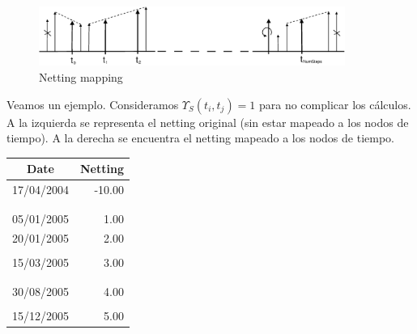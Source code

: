 \begin{figure}[!hb]
\begin{center}
\includegraphics[width=10cm,angle=0]{./images/nettingmapping.eps}
\caption{Netting mapping}
\label{timetranches}
\end{center}
\end{figure}

Veamos un ejemplo. Consideramos $\Upsilon_S(t_i,t_j)=1$ para no complicar los c\'alculos.
A la izquierda se representa el netting original (sin estar mapeado a los nodos de
tiempo). A la derecha se encuentra el netting mapeado a los nodos de tiempo.
\newline
\newline
\begin{minipage}[c]{0.4\columnwidth}%
\centering
\begin{tabular}{c|r}
\textbf{Date} & \textbf{Netting} \\
\hline
17/04/2004 & -10.00 \\
           &        \\
           &        \\
05/01/2005 &   1.00 \\
20/01/2005 &   2.00 \\
           &        \\
15/03/2005 &   3.00 \\
           &        \\
           &        \\
30/08/2005 &   4.00 \\
           &        \\
15/12/2005 &   5.00 \\
\end{tabular}
\end{minipage}%
